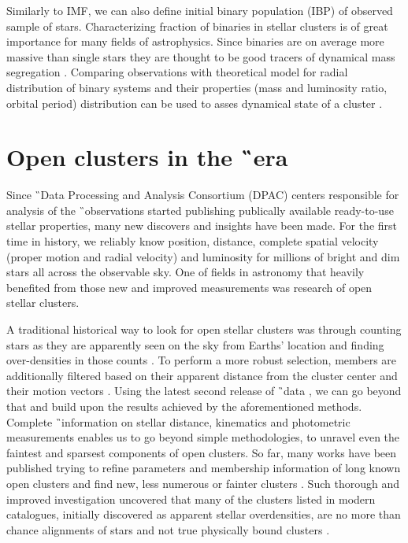Similarly to IMF, we can also define initial binary population (IBP) of observed sample of stars. Characterizing fraction of binaries in stellar clusters is of great importance for many fields of astrophysics. Since binaries are on average more massive than single stars they are thought to be good tracers of dynamical mass segregation \cite{2015arXiv151000099D}. Comparing observations with theoretical model for radial distribution of binary systems and their properties (mass and luminosity ratio, orbital period) distribution can be used to asses dynamical state of a cluster \cite{1999NewA....4..495K}.

\section{Open clusters in the \G\ era}
\label{sec:open_clust_gaia}
Since \G\ Data Processing and Analysis Consortium (DPAC) centers responsible for analysis of the \G\ observations started publishing publically available ready-to-use stellar properties, many new discovers and insights have been made. For the first time in history, we reliably know position, distance, complete spatial velocity (proper motion and radial velocity) and luminosity for millions of bright and dim stars all across the observable sky. One of fields in astronomy that heavily benefited from those new and improved measurements was research of open stellar clusters.

A traditional historical way to look for open stellar clusters was through counting stars as they are apparently seen on the sky from Earths' location and finding over-densities in those counts \cite{1988AJ.....95..108L, 2014A&A...568A..51S}. To perform a more robust selection, members are additionally filtered based on their apparent distance from the cluster center and their motion vectors \cite{2017A&A...601A..19G}. Using the latest second release of \G\ data \citep[DR2,][]{2018arXiv180409365G}, we can go beyond that and build upon the results achieved by the aforementioned methods. Complete \G\ information on stellar distance, kinematics and photometric measurements enables us to go beyond simple methodologies, to unravel even the faintest and sparsest components of open clusters. So far, many works have been published trying to refine parameters and membership information of long known open clusters \cite{2017A&A...601A..19G, 2018A&A...618A..93C, 2019A&A...627A..35C} and find new, less numerous or fainter clusters \cite{2019arXiv190904612B, 2019ApJS..245...32L, 2019JKAS...52..145S, 2019A&A...624A.126C, 2020arXiv200107122C}. Such thorough and improved investigation uncovered that many of the clusters listed in modern catalogues, initially discovered as apparent stellar overdensities, are no more than chance alignments of stars and not true physically bound clusters \cite{1998A&A...340..402B, 2000A&A...357..145C, 2016AJ....152....7H, 2018MNRAS.480.5242K, 2020A&A...633A..99C}.

